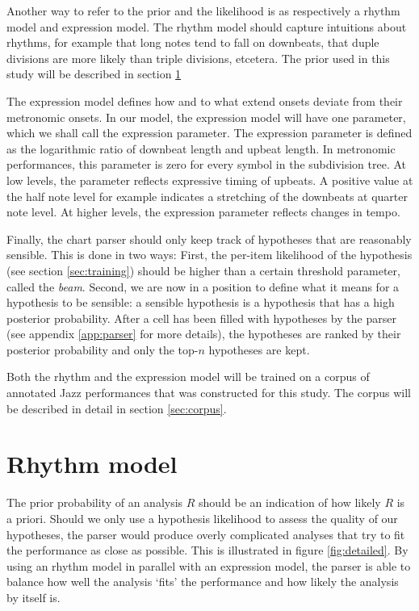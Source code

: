 Another way to refer to the prior and the likelihood is as respectively a rhythm model and expression model. The rhythm model should capture intuitions about rhythms, for example that long notes tend to fall on downbeats, that duple divisions are more likely than triple divisions, etcetera. The prior used in this study will be described in section \ref{sec:prior}

The expression model defines how and to what extend onsets deviate from their metronomic onsets. In our model, the expression model will have one parameter, which we shall call the expression parameter. The expression parameter is defined as the logarithmic ratio of downbeat length and upbeat length. In metronomic performances, this parameter is zero for every symbol in the subdivision tree. At low levels, the parameter reflects expressive timing of upbeats. A positive value at the half note level for example indicates a stretching of the downbeats at quarter note level. At higher levels, the expression parameter reflects changes in tempo.


Finally, the chart parser should only keep track of hypotheses that are reasonably sensible. This is done in two ways: First, the per-item likelihood of the hypothesis (see section \ref{sec:training}) should be higher than a certain threshold parameter, called the \textit{beam}. Second, we are now in a position to define what it means for a hypothesis to be sensible: a sensible hypothesis is a hypothesis that has a high posterior probability. After a cell has been filled with hypotheses by the parser (see appendix \ref{app:parser} for more details), the hypotheses are ranked by their posterior probability and only the top-$n$ hypotheses are kept.

Both the rhythm and the expression model will be trained on a corpus of annotated Jazz performances that was constructed for this study. The corpus will be described in detail in section \ref{sec:corpus}.

\section{Rhythm model}
\label{sec:prior}

The prior probability of an analysis $R$ should be an indication of how likely $R$ is a priori. Should we only use a hypothesis likelihood to assess the quality of our hypotheses, the parser would produce overly complicated analyses that try to fit the performance as close as possible. This is illustrated in figure \ref{fig:detailed}. By using an rhythm model in parallel with an expression model, the parser is able to balance how well the analysis `fits' the performance and how likely the analysis by itself is.

